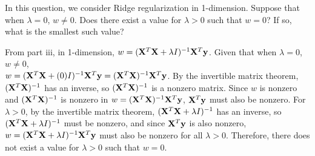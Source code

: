 \subproblem In this question, we consider Ridge regularization in 1-dimension. Suppose that when $\lambda = 0$, $w \neq 0$. Does there exist a value for $\lambda > 0$ such that $w = 0$? If so, what is the smallest such value?

From part iii, in 1-dimension, $w = (\mathbf{X}^T\mathbf{X} + \lambda I)^{-1}\mathbf{X}^T\mathbf{y}$. Given that when $\lambda = 0$, $w \neq 0$,\\
$w = (\mathbf{X}^T\mathbf{X} + (0) I)^{-1}\mathbf{X}^T\mathbf{y} = (\mathbf{X}^T\mathbf{X})^{-1}\mathbf{X}^T\mathbf{y}$. By the invertible matrix theorem, $(\mathbf{X}^T\mathbf{X})^{-1}$ has an inverse, so $(\mathbf{X}^T\mathbf{X})^{-1}$ is a nonzero matrix. Since $w$ is nonzero and $(\mathbf{X}^T\mathbf{X})^{-1}$ is nonzero in $w = (\mathbf{X}^T\mathbf{X})^{-1}\mathbf{X}^T\mathbf{y}$, $\mathbf{X}^T\mathbf{y}$ must also be nonzero. For $\lambda > 0$, by the invertible matrix theorem, $(\mathbf{X}^T\mathbf{X} + \lambda I)^{-1}$ has an inverse, so $(\mathbf{X}^T\mathbf{X} + \lambda I)^{-1}$ must be nonzero, and since $\mathbf{X}^T\mathbf{y}$ is also nonzero, $w = (\mathbf{X}^T\mathbf{X} + \lambda I)^{-1}\mathbf{X}^T\mathbf{y}$ must also be nonzero for all $\lambda > 0$. Therefore, there does not exist a value for $\lambda > 0$ such that $w = 0$.



